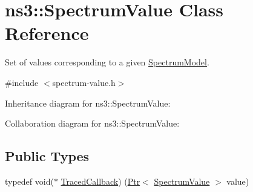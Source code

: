 \hypertarget{classns3_1_1SpectrumValue}{}\section{ns3\+:\+:Spectrum\+Value Class Reference}
\label{classns3_1_1SpectrumValue}


Set of values corresponding to a given \hyperlink{classns3_1_1SpectrumModel}{Spectrum\+Model}.  




{\ttfamily \#include $<$spectrum-\/value.\+h$>$}



Inheritance diagram for ns3\+:\+:Spectrum\+Value\+:


Collaboration diagram for ns3\+:\+:Spectrum\+Value\+:
\subsection*{Public Types}
\begin{DoxyCompactItemize}
\item 
typedef void($\ast$ \hyperlink{classns3_1_1SpectrumValue_a51d502bf2f001e03cd9cd410fc97383c}{Traced\+Callback}) (\hyperlink{classns3_1_1Ptr}{Ptr}$<$ \hyperlink{classns3_1_1SpectrumValue}{Spectrum\+Value} $>$ value)
\end{DoxyCompactItemize}
